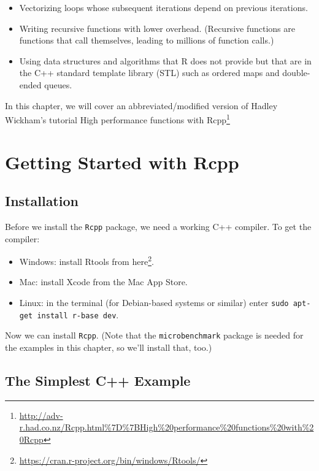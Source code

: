 \documentclass[
]{krantz}
\providecommand{\tightlist}{%
  \setlength{\itemsep}{0pt}\setlength{\parskip}{0pt}}
\renewcommand{\href}[2]{#2\footnote{\url{#1}}}
\begin{document}
\begin{itemize}
\tightlist
\item
  Vectorizing loops whose subsequent iterations depend on previous iterations.
\item
  Writing recursive functions with lower overhead. (Recursive functions are functions that call themselves, leading to millions of function calls.)
\item
  Using data structures and algorithms that R does not provide but that are in the C++ standard template library (STL) such as ordered maps and double-ended queues.
\end{itemize}

In this chapter, we will cover an abbreviated/modified version of Hadley Wickham's tutorial \href{http://adv-r.had.co.nz/Rcpp.html\%7D\%7BHigh\%20performance\%20functions\%20with\%20Rcpp}{High performance functions with Rcpp}

\hypertarget{getting-started-with-rcpp}{%
\section{Getting Started with Rcpp}\label{getting-started-with-rcpp}}

\hypertarget{installation}{%
\subsection{Installation}\label{installation}}

Before we install the \texttt{Rcpp} package, we need a working C++ compiler. To get the compiler:

\begin{itemize}
\tightlist
\item
  Windows: install Rtools from \href{https://cran.r-project.org/bin/windows/Rtools/}{here}.
\item
  Mac: install Xcode from the Mac App Store.
\item
  Linux: in the terminal (for Debian-based systems or similar) enter
  \texttt{sudo\ apt-get\ install\ r-base\ dev}.
\end{itemize}

Now we can install \texttt{Rcpp}. (Note that the \texttt{microbenchmark} package is needed for the examples in this chapter, so we'll install that, too.)

\hypertarget{the-simplest-c-example}{%
\subsection{The Simplest C++ Example}\label{the-simplest-c-example}}
\end{document}
